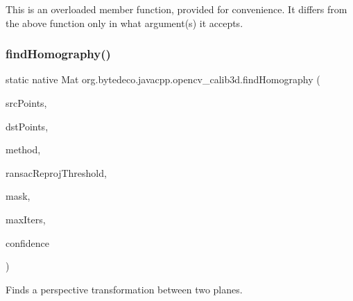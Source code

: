 This is an overloaded member function, provided for convenience. It differs from the above function only in what argument(s) it accepts. \mbox{\label{group__calib3d_ga2e20e41b600c13c08d376e5df367f480}} 
\subsubsection{\texorpdfstring{find\+Homography()}{findHomography()}\hspace{0.1cm}{\footnotesize\ttfamily [1/2]}}
{\footnotesize\ttfamily static native Mat org.\+bytedeco.\+javacpp.\+opencv\+\_\+calib3d.\+find\+Homography (\begin{DoxyParamCaption}\item[{@By\+Val Mat}]{src\+Points,  }\item[{@By\+Val Mat}]{dst\+Points,  }\item[{int}]{method,  }\item[{double}]{ransac\+Reproj\+Threshold,  }\item[{@By\+Val(null\+Value=\char`\"{}cv\+::\+Output\+Array(cv\+::no\+Array())\char`\"{}) Mat}]{mask,  }\item[{int}]{max\+Iters,  }\item[{double}]{confidence }\end{DoxyParamCaption})\hspace{0.3cm}{\ttfamily [static]}}



Finds a perspective transformation between two planes. 


